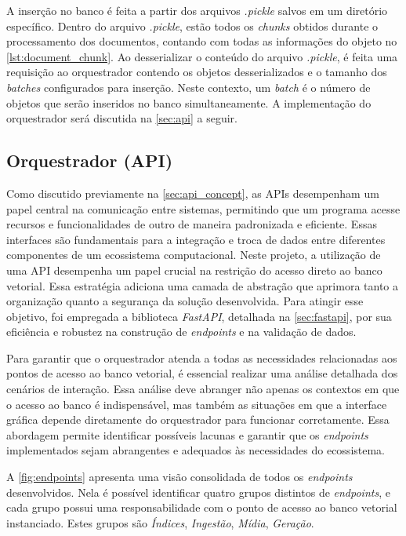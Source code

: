 \documentclass[a4paper, 12pt]{article}
\begin{document}
    A inserção no banco é feita a partir dos arquivos \textit{.pickle} salvos em um diretório específico. Dentro do arquivo \textit{.pickle}, estão todos os \textit{chunks} obtidos durante o processamento dos documentos, contando com todas as informações do objeto no \autoref{lst:document_chunk}. Ao desserializar o conteúdo do arquivo \textit{.pickle}, é feita uma requisição ao orquestrador contendo os objetos desserializados e o tamanho dos \textit{batches} configurados para inserção. Neste contexto, um \textit{batch} é o número de objetos que serão inseridos no banco simultaneamente. A implementação do orquestrador será discutida na \autoref{sec:api} a seguir.

    \subsection{Orquestrador (API)}\label{sec:api}

    Como discutido previamente na \autoref{sec:api_concept}, as APIs desempenham um papel central na comunicação entre sistemas, permitindo que um programa acesse recursos e funcionalidades de outro de maneira padronizada e eficiente. Essas interfaces são fundamentais para a integração e troca de dados entre diferentes componentes de um ecossistema computacional. Neste projeto, a utilização de uma API desempenha um papel crucial na restrição do acesso direto ao banco vetorial. Essa estratégia adiciona uma camada de abstração que aprimora tanto a organização quanto a segurança da solução desenvolvida. Para atingir esse objetivo, foi empregada a biblioteca \textit{FastAPI}, detalhada na \autoref{sec:fastapi}, por sua eficiência e robustez na construção de \textit{endpoints} e na validação de dados.
    
    Para garantir que o orquestrador atenda a todas as necessidades relacionadas aos pontos de acesso ao banco vetorial, é essencial realizar uma análise detalhada dos cenários de interação. Essa análise deve abranger não apenas os contextos em que o acesso ao banco é indispensável, mas também as situações em que a interface gráfica depende diretamente do orquestrador para funcionar corretamente. Essa abordagem permite identificar possíveis lacunas e garantir que os \textit{endpoints} implementados sejam abrangentes e adequados às necessidades do ecossistema. 
    
    A \autoref{fig:endpoints} apresenta uma visão consolidada de todos os \textit{endpoints} desenvolvidos. Nela é possível identificar quatro grupos distintos de \textit{endpoints}, e cada grupo possui uma responsabilidade com o ponto de acesso ao banco vetorial instanciado. Estes grupos são \textit{Índices}, \textit{Ingestão}, \textit{Mídia}, \textit{Geração}.
    
\end{document}
